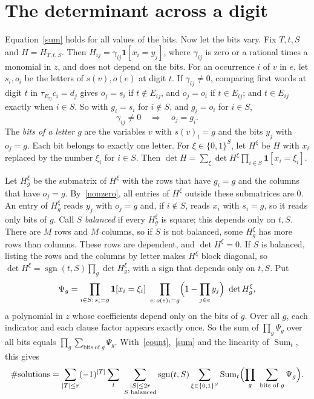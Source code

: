 \documentclass[11pt]{article}
\numberwithin{equation}{section}
\theoremstyle{remark}
\newcommand{\bits}{\{0,1\}}
\begin{document}
\section{The determinant across a digit}\label{sec:factor}

Equation~\eqref{sum} holds for all values of the bits. Now let the bits vary. Fix $T,t,S$ and $H=H_{T,t,S}$. Then $H_{ij}=\gamma_{ij}\mathbf 1[x_i=y_j]$, where $\gamma_{ij}$ is zero or a rational times a monomial in $z$, and does not depend on the bits. For an occurrence $i$ of $v$ in $e$, let $s_i,o_i$ be the letters of $s(v),o(e)$ at digit $t$. If $\gamma_{ij}\ne0$, comparing first words at digit $t$ in $\tau_{E_{ij}}c_i=d_j$ gives $o_j=s_i$ if $t\notin E_{ij}$, and $o_j=o_i$ if $t\in E_{ij}$; and $t\in E_{ij}$ exactly when $i\in S$. So with $g_i=s_i$ for $i\notin S$, and $g_i=o_i$ for $i\in S$,
\begin{equation}\label{nonzero}
\gamma_{ij}\ne0\quad\Longrightarrow\quad o_j=g_i.
\end{equation}
The \emph{bits of a letter $g$} are the variables $v$ with $s(v)_t=g$ and the bits $y_j$ with $o_j=g$. Each bit belongs to exactly one letter. For $\xi\in\bits^S$, let $H^\xi$ be $H$ with $x_i$ replaced by the number $\xi_i$ for $i\in S$. Then $\det H=\sum_\xi\det H^\xi\prod_{i\in S}\mathbf 1[x_i=\xi_i]$.

Let $H^\xi_g$ be the submatrix of $H^\xi$ with the rows that have $g_i=g$ and the columns that have $o_j=g$. By~\eqref{nonzero}, all entries of $H^\xi$ outside these submatrices are $0$. An entry of $H^\xi_g$ reads $y_j$ with $o_j=g$ and, if $i\notin S$, reads $x_i$ with $s_i=g$, so it reads only bits of $g$. Call $S$ \emph{balanced} if every $H^\xi_g$ is square; this depends only on $t,S$. There are $M$ rows and $M$ columns, so if $S$ is not balanced, some $H^\xi_g$ has more rows than columns. These rows are dependent, and $\det H^\xi=0$. If $S$ is balanced, listing the rows and the columns by letter makes $H^\xi$ block diagonal, so $\det H^\xi=\operatorname{sgn}(t,S)\prod_g\det H^\xi_g$, with a sign that depends only on $t,S$. Put
\[
\Psi_g=\prod_{i\in S:\,s_i=g}\mathbf 1[x_i=\xi_i]\ \prod_{e:\,o(e)_t=g}\Bigl(1-\prod_{j\in e}y_j\Bigr)\ \det H^\xi_g,
\]
a polynomial in $z$ whose coefficients depend only on the bits of $g$. Over all $g$, each indicator and each clause factor appears exactly once. So the sum of $\prod_g\Psi_g$ over all bits equals $\prod_g\sum_{\text{bits of }g}\Psi_g$. With~\eqref{count},~\eqref{sum} and the linearity of $\operatorname{Sum}_t$, this gives
\begin{equation}\label{final}
\#\text{solutions}=\sum_{|T|\le r}(-1)^{|T|}\sum_t\ \sum_{\substack{|S|\le2r\\S\text{ balanced}}}\operatorname{sgn}(t,S)\sum_{\xi\in\bits^S}\operatorname{Sum}_t\Bigl(\prod_g\ \sum_{\text{bits of }g}\Psi_g\Bigr).
\end{equation}
\end{document}
